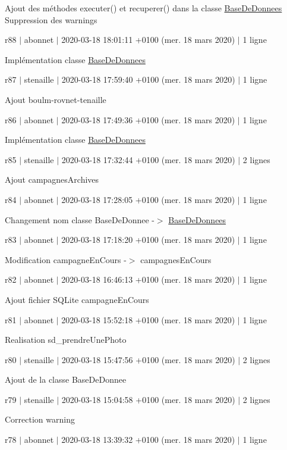 Ajout des méthodes executer() et recuperer() dans la classe \hyperlink{class_base_de_donnees}{Base\+De\+Donnees} Suppression des warnings

r88 $\vert$ abonnet $\vert$ 2020-\/03-\/18 18\+:01\+:11 +0100 (mer. 18 mars 2020) $\vert$ 1 ligne

Implémentation classe \hyperlink{class_base_de_donnees}{Base\+De\+Donnees}

r87 $\vert$ stenaille $\vert$ 2020-\/03-\/18 17\+:59\+:40 +0100 (mer. 18 mars 2020) $\vert$ 1 ligne

Ajout boulm-\/rovnet-\/tenaille

r86 $\vert$ abonnet $\vert$ 2020-\/03-\/18 17\+:49\+:36 +0100 (mer. 18 mars 2020) $\vert$ 1 ligne

Implémentation classe \hyperlink{class_base_de_donnees}{Base\+De\+Donnees}

r85 $\vert$ stenaille $\vert$ 2020-\/03-\/18 17\+:32\+:44 +0100 (mer. 18 mars 2020) $\vert$ 2 lignes

Ajout campagnes\+Archives

r84 $\vert$ abonnet $\vert$ 2020-\/03-\/18 17\+:28\+:05 +0100 (mer. 18 mars 2020) $\vert$ 1 ligne

Changement nom classe Base\+De\+Donnee -\/$>$ \hyperlink{class_base_de_donnees}{Base\+De\+Donnees}

r83 $\vert$ abonnet $\vert$ 2020-\/03-\/18 17\+:18\+:20 +0100 (mer. 18 mars 2020) $\vert$ 1 ligne

Modification campagne\+En\+Cours -\/$>$ campagnes\+En\+Cours

r82 $\vert$ abonnet $\vert$ 2020-\/03-\/18 16\+:46\+:13 +0100 (mer. 18 mars 2020) $\vert$ 1 ligne

Ajout fichier S\+Q\+Lite campagne\+En\+Cours

r81 $\vert$ abonnet $\vert$ 2020-\/03-\/18 15\+:52\+:18 +0100 (mer. 18 mars 2020) $\vert$ 1 ligne

Realisation sd\+\_\+prendre\+Une\+Photo

r80 $\vert$ stenaille $\vert$ 2020-\/03-\/18 15\+:47\+:56 +0100 (mer. 18 mars 2020) $\vert$ 2 lignes

Ajout de la classe Base\+De\+Donnee

r79 $\vert$ stenaille $\vert$ 2020-\/03-\/18 15\+:04\+:58 +0100 (mer. 18 mars 2020) $\vert$ 2 lignes

Correction warning

r78 $\vert$ abonnet $\vert$ 2020-\/03-\/18 13\+:39\+:32 +0100 (mer. 18 mars 2020) $\vert$ 1 ligne

